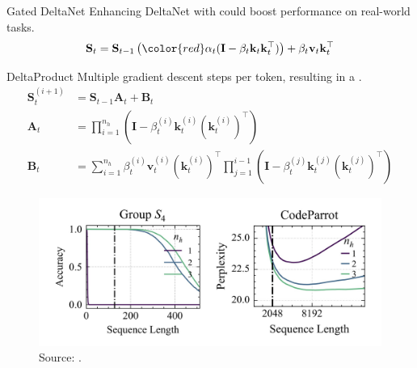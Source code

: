 \begin{frame}{Gated DeltaNet}
    Enhancing DeltaNet with {\color{red}{Mamba2-like gating mechanism}} could boost performance on real-world tasks.
        \begin{align*}
            \mathbf{S}_t = \mathbf{S}_{t-1} \left({\color{red}\alpha_t}(\mathbf{I} - \beta_t \mathbf{k}_t \mathbf{k}_t^\top)\right) + \beta_t \mathbf{v}_t \mathbf{k}_t^\top
        \end{align*}
    \begin{table}[h!]
        \centering
        \caption{Performance comparison of different 1.3B models trained on 100B tokens. Source: \cite{yang2024gateddeltanetworksimproving}.}
        \label{tab:model_comparison}
    \end{table}
\end{frame}
\begin{frame}{DeltaProduct}
    Multiple gradient descent steps per token, resulting in a {\color{red}{high-rank recurrent update}}.
    \begin{align*}
        \mathbf{S}_t^{(i+1)} &= \mathbf{S}_{t-1} \mathbf{A}_t + \mathbf{B}_t \\
        \mathbf{A}_t &= \prod_{i=1}^{n_h} \left(\mathbf{I} - \beta_t^{(i)} \mathbf{k}_t^{(i)} (\mathbf{k}_t^{(i)})^\top\right) \\
        \mathbf{B}_t &= \sum_{i=1}^{n_h} \beta_t^{(i)} \mathbf{v}_t^{(i)} (\mathbf{k}_t^{(i)})^\top \prod_{j=1}^{i-1} \left(\mathbf{I} - \beta_t^{(j)} \mathbf{k}_t^{(j)} (\mathbf{k}_t^{(j)})^\top\right)
    \end{align*}
    \begin{figure}
        \centering
        \includegraphics[width=0.65\linewidth]{figure/deltaproduct.jpg}
        \vspace{-4mm}
        \caption{Source: \cite{siems2025deltaproductincreasingexpressivitydeltanet}.}
    \end{figure}
\end{frame}
